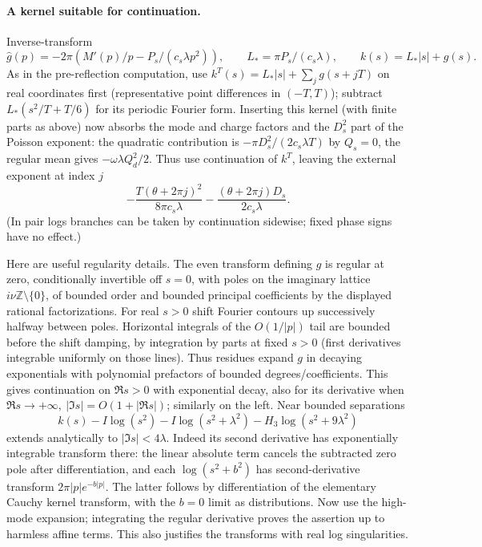 \paragraph{A kernel suitable for continuation.}
Inverse-transform
\[
 \widehat g(p)=-2\pi\left(M'(p)/p-P_s/(c_s\lambda p^2)\right),\qquad
 L_*=\pi P_s/(c_s\lambda),\qquad k(s)=L_*|s|+g(s).
\]
As in the pre-reflection computation, use \(k^T(s)=L_*|s|+\sum_j g(s+jT)\) on real coordinates first (representative point differences in \((-T,T)\)); subtract \(L_*(s^2/T+T/6)\) for its periodic Fourier form. Inserting this kernel (with finite parts as above) now absorbs the mode and charge factors and the \(D_s^2\) part of the Poisson exponent: the quadratic contribution is \(-\pi D_s^2/(2c_s\lambda T)\) by \(Q_s=0\), the regular mean gives \(-\omega\lambda Q_d^2/2\). Thus use continuation of \(k^T\), leaving the external exponent at index \(j\)
\begin{equation}
 -\frac{T(\theta+2\pi j)^2}{8\pi c_s\lambda}
 -\frac{(\theta+2\pi j)D_s}{2 c_s\lambda}.                              \label{c2:eq-V7}
\end{equation}
(In pair logs branches can be taken by continuation sidewise; fixed phase signs have no effect.)

Here are useful regularity details. The even transform defining \(g\) is regular at zero, conditionally invertible off \(s=0\), with poles on the imaginary lattice \(i\nu\mathbb Z\setminus\{0\}\), of bounded order and bounded principal coefficients by the displayed rational factorizations. For real \(s>0\) shift Fourier contours up successively halfway between poles. Horizontal integrals of the \(O(1/|p|)\) tail are bounded before the shift damping, by integration by parts at fixed \(s>0\) (first derivatives integrable uniformly on those lines). Thus residues expand \(g\) in decaying exponentials with polynomial prefactors of bounded degrees/coefficients. This gives continuation on \(\Re s>0\) with exponential decay, also for its derivative when \(\Re s\to+\infty,\ |\Im s|=O(1+|\Re s|)\); similarly on the left. Near bounded separations
\[
 k(s)-I\log(s^2)-I\log(s^2+\lambda^2)-H_3\log(s^2+9\lambda^2)
\]
extends analytically to \(|\Im s|<4\lambda\). Indeed its second derivative has exponentially integrable transform there: the linear absolute term cancels the subtracted zero pole after differentiation, and each \(\log(s^2+b^2)\) has second-derivative transform \(2\pi |p| e^{-b|p|}\). The latter follows by differentiation of the elementary Cauchy kernel transform, with the \(b=0\) limit as distributions. Now use the high-mode expansion; integrating the regular derivative proves the assertion up to harmless affine terms. This also justifies the transforms with real log singularities.

